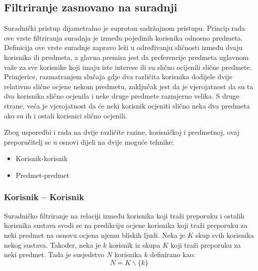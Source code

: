\documentclass[times, utf8, diplomski, numeric]{fer}
\begin{document}
\subsection{Filtriranje zasnovano na suradnji}
Suradnički pristup dijametralno je suprotan sadržajnom pristupu. Princip rada
ove vrste filtriranja suradnja je između pojedinih korisnika odnosno predmeta.
Definicija ove vrste suradnje zapravo leži u određivanju sličnosti između dvaju
korisnika ili predmeta, a glavna premisa jest da preferencije predmeta uglavnom
važe za sve korisnike koji imaju iste interese ili su slično ocijenili slične
predmete. Primjerice, razmatranjem slučaja gdje dva različita korisnika dodijele
dvije relativno slične ocjene nekom predmetu, zaključak jest da je vjerojatnost
da su ta dva korisnika slično ocjenila i neke druge predmete razmjerno velika. S
druge strane, veća je vjerojatnost da će neki korisnik ocjeniti slično neka dva
predmeta ako su ih i ostali korisnici slično ocjenili.

Zbog usporedbi i rada na dvije različite razine, korisničkoj i predmetnoj, ovaj
preporučitelj se u osnovi dijeli na dvije moguće tehnike:
\begin{itemize}
  \item Korisnik-korisnik 
  \item Predmet-predmet 
\end{itemize}

\subsubsection{Korisnik -- Korisnik}
Suradničko filtriranje na relaciji između korisnika koji traži preporuku i
ostalih korisnika sustava svodi se na predikciju ocjene korisnika koji traži
preporuku za neki predmet na osnovu ocjena njemu bliskih ljudi. Neka je $K$ skup
svih korisnika nekog sustava. Također, neka je $k$ korisnik iz skupa $K$ koji
traži preporuku za neki predmet. Tada je susjedstvo $N$ korisnika $k$
definirano kao:
\begin{equation}
\label{eq:susjedstvo}
	N = K \backslash \{k\}
\end{equation}
\end{document}
